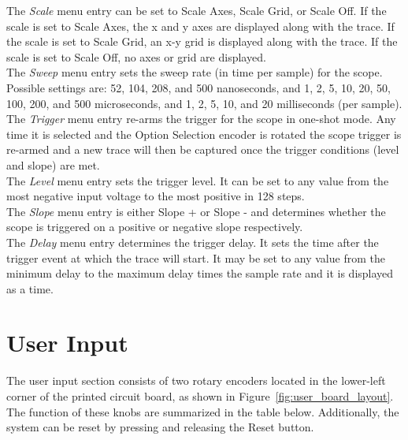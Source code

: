 \documentclass[titlepage]{scrartcl}
\begin{document}
The \textit{Scale} menu entry can be set to Scale Axes, Scale Grid, or Scale Off. If the scale is set to Scale Axes, the x and y axes are displayed along with the trace. If the scale is set to Scale Grid, an x-y grid is displayed along with the trace. If the scale is set to Scale Off, no axes or grid are displayed.\\

The \textit{Sweep} menu entry sets the sweep rate (in time per sample) for the scope. Possible settings are: 52, 104, 208, and 500 nanoseconds, and 1, 2, 5, 10, 20, 50, 100, 200, and 500 microseconds, and 1, 2, 5, 10, and 20 milliseconds (per sample).\\

The \textit{Trigger} menu entry re-arms the trigger for the scope in one-shot mode. Any time it is selected and the Option Selection encoder is rotated the scope trigger is re-armed and a new trace will then be captured once the trigger conditions (level and slope) are met.\\

The \textit{Level} menu entry sets the trigger level. It can be set to any value from the most negative input voltage to the most positive in 128 steps.\\

The \textit{Slope} menu entry is either Slope + or Slope - and determines whether the scope is triggered on a positive or negative slope respectively.\\

The \textit{Delay} menu entry determines the trigger delay. It sets the time after the trigger event at which the trace will start. It may be set to any value from the minimum delay to the maximum delay times the sample rate and it is displayed as a time.\\

	\section{User Input}
	The user input section consists of two rotary encoders located in the lower-left corner of the printed circuit board, as shown in Figure~\ref{fig:user_board_layout}. The function of these knobs are summarized in the table below. Additionally, the system can be reset by pressing and releasing the Reset button.
\end{document}
